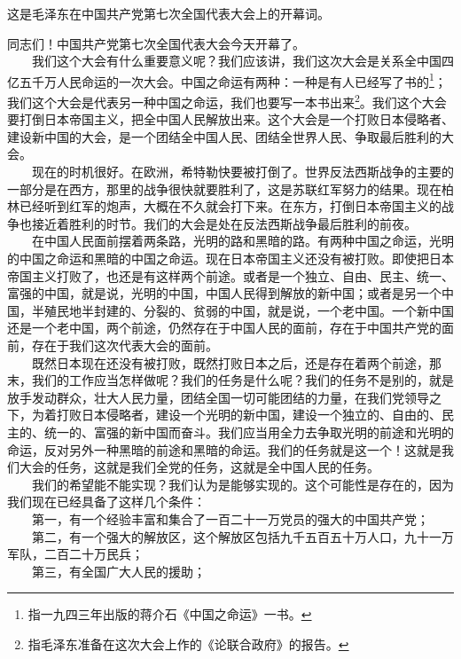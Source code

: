 \documentclass[cn,11pt,chinese]{elegantbook}
\begin{document}
\begin{introduction}\item  这是毛泽东在中国共产党第七次全国代表大会上的开幕词。\end{introduction}
同志们！中国共产党第七次全国代表大会今天开幕了。\\
　　我们这个大会有什么重要意义呢？我们应该讲，我们这次大会是关系全中国四亿五千万人民命运的一次大会。中国之命运有两种：一种是有人已经写了书的\footnote[1]{ 指一九四三年出版的蒋介石《中国之命运》一书。}；我们这个大会是代表另一种中国之命运，我们也要写一本书出来\footnote[2]{ 指毛泽东准备在这次大会上作的《论联合政府》的报告。}。我们这个大会要打倒日本帝国主义，把全中国人民解放出来。这个大会是一个打败日本侵略者、建设新中国的大会，是一个团结全中国人民、团结全世界人民、争取最后胜利的大会。\\
　　现在的时机很好。在欧洲，希特勒快要被打倒了。世界反法西斯战争的主要的一部分是在西方，那里的战争很快就要胜利了，这是苏联红军努力的结果。现在柏林已经听到红军的炮声，大概在不久就会打下来。在东方，打倒日本帝国主义的战争也接近着胜利的时节。我们的大会是处在反法西斯战争最后胜利的前夜。\\
　　在中国人民面前摆着两条路，光明的路和黑暗的路。有两种中国之命运，光明的中国之命运和黑暗的中国之命运。现在日本帝国主义还没有被打败。即使把日本帝国主义打败了，也还是有这样两个前途。或者是一个独立、自由、民主、统一、富强的中国，就是说，光明的中国，中国人民得到解放的新中国；或者是另一个中国，半殖民地半封建的、分裂的、贫弱的中国，就是说，一个老中国。一个新中国还是一个老中国，两个前途，仍然存在于中国人民的面前，存在于中国共产党的面前，存在于我们这次代表大会的面前。\\
　　既然日本现在还没有被打败，既然打败日本之后，还是存在着两个前途，那末，我们的工作应当怎样做呢？我们的任务是什么呢？我们的任务不是别的，就是放手发动群众，壮大人民力量，团结全国一切可能团结的力量，在我们党领导之下，为着打败日本侵略者，建设一个光明的新中国，建设一个独立的、自由的、民主的、统一的、富强的新中国而奋斗。我们应当用全力去争取光明的前途和光明的命运，反对另外一种黑暗的前途和黑暗的命运。我们的任务就是这一个！这就是我们大会的任务，这就是我们全党的任务，这就是全中国人民的任务。\\
　　我们的希望能不能实现？我们认为是能够实现的。这个可能性是存在的，因为我们现在已经具备了这样几个条件：\\
　　第一，有一个经验丰富和集合了一百二十一万党员的强大的中国共产党；\\
　　第二，有一个强大的解放区，这个解放区包括九千五百五十万人口，九十一万军队，二百二十万民兵；\\
　　第三，有全国广大人民的援助；\\
\end{document}
